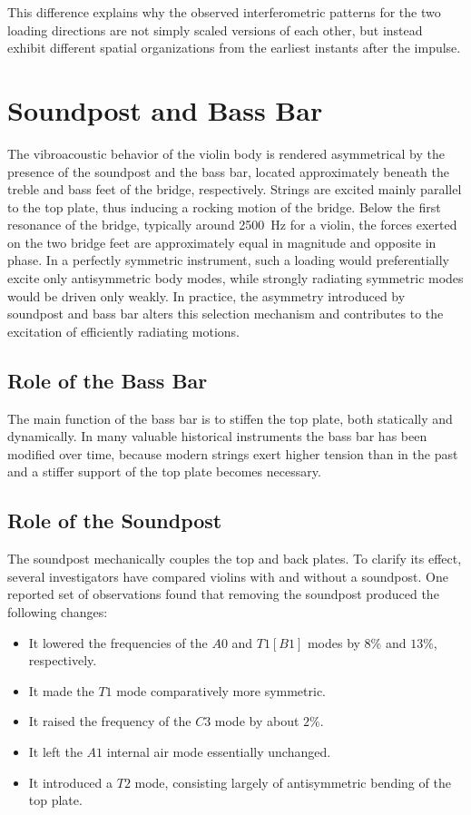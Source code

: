 This difference explains why the observed interferometric patterns for the two loading directions are not simply scaled versions of each other, but instead exhibit different spatial organizations from the earliest instants after the impulse. 

\section{Soundpost and Bass Bar}

The vibroacoustic behavior of the violin body is rendered asymmetrical by the presence of the soundpost and the bass bar, located approximately beneath the treble and bass feet of the bridge, respectively. Strings are excited mainly parallel to the top plate, thus inducing a rocking motion of the bridge. Below the first resonance of the bridge, typically around \SI{2500}{\hertz} for a violin, the forces exerted on the two bridge feet are approximately equal in magnitude and opposite in phase. In a perfectly symmetric instrument, such a loading would preferentially excite only antisymmetric body modes, while strongly radiating symmetric modes would be driven only weakly. In practice, the asymmetry introduced by soundpost and bass bar alters this selection mechanism and contributes to the excitation of efficiently radiating motions. 

\subsection{Role of the Bass Bar}

The main function of the bass bar is to stiffen the top plate, both statically and dynamically. In many valuable historical instruments the bass bar has been modified over time, because modern strings exert higher tension than in the past and a stiffer support of the top plate becomes necessary.

\subsection{Role of the Soundpost} 

The soundpost mechanically couples the top and back plates. To clarify its effect, several investigators have compared violins with and without a soundpost. One reported set of observations found that removing the soundpost produced the following changes: 

\begin{itemize}
    \item It lowered the frequencies of the \( A0 \) and \( T1[B1] \) modes by \( 8\% \) and \( 13\% \), respectively.
    \item It made the \( T1 \) mode comparatively more symmetric.
    \item It raised the frequency of the \( C3 \) mode by about \( 2\% \).
    \item It left the \( A1 \) internal air mode essentially unchanged.
    \item It introduced a \( T2 \) mode, consisting largely of antisymmetric bending of the top plate.
\end{itemize}

